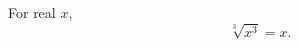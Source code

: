 \documentclass{article}
\begin{document}
For real $x$,
\begin{equation}
\sqrt[3]{x^3} = x .
\label{eq:cube}
\end{equation}
\end{document}

